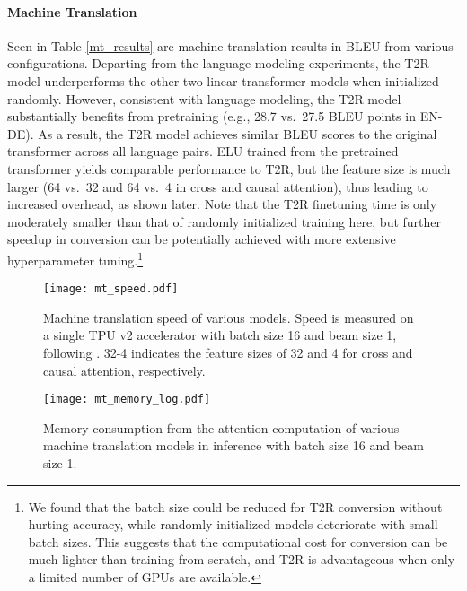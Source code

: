 \documentclass[11pt]{article}
\newcommand{\TRNN}{T2R\xspace}
\begin{document}
\paragraph{Machine Translation}
Seen in Table \ref{mt_results} are machine translation results in BLEU from various configurations.
Departing from the language modeling experiments, the \TRNN model underperforms the other two linear transformer models when initialized randomly.
However, consistent with language modeling, the \TRNN model substantially benefits from pretraining (e.g., 28.7 vs.\ 27.5 BLEU points in EN-DE).
As a result, the \TRNN model achieves similar BLEU scores to the original transformer across all language pairs.
ELU trained from the pretrained transformer yields comparable performance to \TRNN, but the feature size is much larger (64 vs.\ 32 and 64 vs.\ 4 in cross and causal attention), thus leading to increased overhead, as shown later. Note that the \TRNN finetuning time is only moderately smaller than that of randomly initialized training here,
but further speedup in conversion can be potentially achieved with more extensive hyperparameter tuning.\footnote{We found that the batch size could be reduced for \TRNN conversion without hurting accuracy, while randomly initialized models deteriorate with small batch sizes. This suggests that the computational cost for conversion can be much lighter than training from scratch, and \TRNN is advantageous when only a limited number of GPUs are available.}

\begin{figure}[h]
\centering
    \texttt{[image: mt\_speed.pdf]}
\caption{Machine translation speed of various models. Speed is measured on a single TPU v2 accelerator with batch size 16 and beam size 1, following \citet{RFA}. 32-4 indicates the feature sizes of 32 and 4 for cross and causal attention, respectively.} 
\label{fig:mt-speed}
\end{figure}

\begin{figure}[h]
\centering
    \texttt{[image: mt\_memory\_log.pdf]}
\caption{Memory consumption from the attention computation of various machine translation models in inference with batch size 16 and beam size 1. 
}
\label{fig:mt-memory}
\end{figure}
\end{document}
